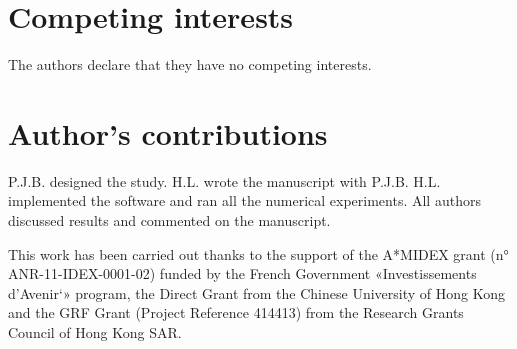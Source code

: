 \documentclass[twocolumn]{bmcart}
\begin{document}
\begin{backmatter}

\section*{Competing interests}
The authors declare that they have no competing interests.

\section*{Author's contributions}
P.J.B. designed the study. H.L. wrote the manuscript with P.J.B. H.L. implemented the software and ran all the numerical experiments. All authors discussed results and commented on the manuscript.

This work has been carried out thanks to the support of the A*MIDEX grant (n° ANR-11-IDEX-0001-02) funded by the French Government «Investissements d’Avenir`» program, the Direct Grant from the Chinese University of Hong Kong and the GRF Grant (Project Reference 414413) from the Research Grants Council of Hong Kong SAR.






\end{backmatter}
\end{document}
